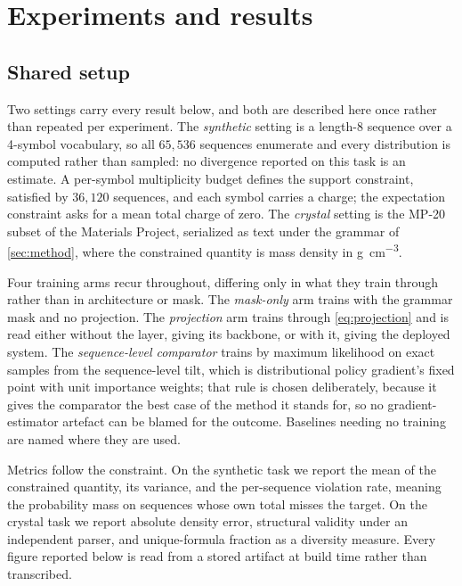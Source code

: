 \section{Experiments and results}
\label{sec:experiments}

\subsection{Shared setup}
\label{sec:setup}

Two settings carry every result below, and both are described here once rather than
repeated per experiment. The \emph{synthetic} setting is a length-8 sequence over a 4-symbol vocabulary, so all
$65{,}536$ sequences enumerate and every distribution is computed rather than sampled: no
divergence reported on this task is an estimate. A per-symbol multiplicity budget defines
the support constraint, satisfied by $36{,}120$ sequences, and each symbol carries a
charge; the expectation constraint asks for a mean total charge of zero. The \emph{crystal}
setting is the MP-20 subset of the Materials Project, serialized as text under the grammar
of \cref{sec:method}, where the constrained quantity is mass density in
\unit{\gram\per\centi\metre\cubed}.

Four training arms recur throughout, differing only in what they train through rather than
in architecture or mask. The \emph{mask-only} arm trains with the grammar mask and no
projection. The \emph{projection} arm trains through \cref{eq:projection} and is read
either without the layer, giving its backbone, or with it, giving the deployed system. The
\emph{sequence-level comparator} trains by maximum likelihood on exact samples from the
sequence-level tilt, which is distributional policy gradient's fixed point with unit
importance weights; that rule is chosen deliberately, because it gives the comparator the
best case of the method it stands for, so no gradient-estimator artefact can be blamed for
the outcome. Baselines needing no training are named where they are used.

Metrics follow the constraint. On the synthetic task we report the mean of the constrained
quantity, its variance, and the per-sequence violation rate, meaning the probability mass
on sequences whose own total misses the target. On the crystal task we report absolute
density error, structural validity under an independent parser, and unique-formula fraction
as a diversity measure. Every figure reported below is read from a stored artifact at build
time rather than transcribed.

